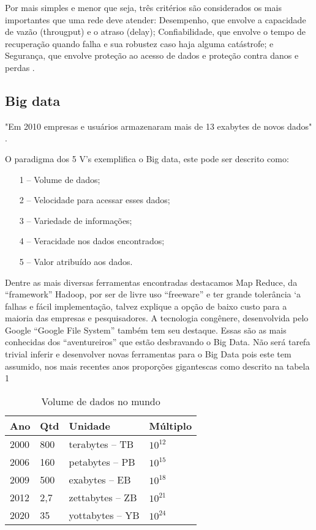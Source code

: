 \documentclass[conference,compsoc]{IEEEtran}
\begin{document}
Por mais simples e menor que seja, três critérios são considerados os mais importantes que uma rede deve atender: Desempenho, que envolve a capacidade de vazão (througput) e o atraso (delay); Confiabilidade, que envolve o tempo de recuperação quando falha e sua robustez caso haja alguma catástrofe; e Segurança, que envolve proteção ao acesso de dados e proteção contra danos e perdas \cite{Forouzan} \cite{Specialski}.



\subsection{Big data}

"Em 2010 empresas e usuários armazenaram mais de 13 exabytes de novos dados" \cite{bigdataQualquerUm}.

O paradigma dos 5 V’s exemplifica o Big data, este pode ser descrito como: 

\begin{enumerate}
	\item[1 --]Volume de dados;
	\item[2 --]Velocidade para acessar esses dados;
	\item[3 --]Variedade de informações;
	\item[4 --]Veracidade nos dados encontrados;
	\item[5 --]Valor atribuído aos dados.
\end{enumerate}
  
Dentre as mais diversas ferramentas encontradas destacamos Map Reduce, da ``framework'' Hadoop, por ser de livre uso ``freeware'' e ter grande tolerância `a falhas e fácil implementação, talvez explique a opção de baixo custo para a maioria das empresas e pesquisadores.
A tecnologia congênere, desenvolvida pelo Google ``Google File System'' também tem seu destaque. Essas são as mais conhecidas dos ``aventureiros'' que estão desbravando o Big Data. Não será tarefa trivial inferir e desenvolver novas ferramentas para o Big Data pois este tem 
assumido, nos mais recentes anos proporções gigantescas como descrito na tabela 1


\begin{table}[!ht]
\scriptsize
\centering
\caption{Volume de dados no mundo}
\begin{tabular}{|p{6mm}|p{5mm}|p{16mm}|p{8mm}|}
\hline
Ano & Qtd & Unidade & Múltiplo \\
\hline
2000 & 800 & terabytes – TB & $10^{12}$ \\ \hline

2006 & 160 & petabytes – PB & $10^{15}$ \\ \hline

2009 & 500 & exabytes – EB & $10^{18}$ \\ \hline

2012 & 2,7 & zettabytes – ZB & $10^{21}$ \\ \hline

2020 & 35 & yottabytes – YB & $10^{24}$ \\ \hline

\end{tabular}
\end{table}
\end{document}
